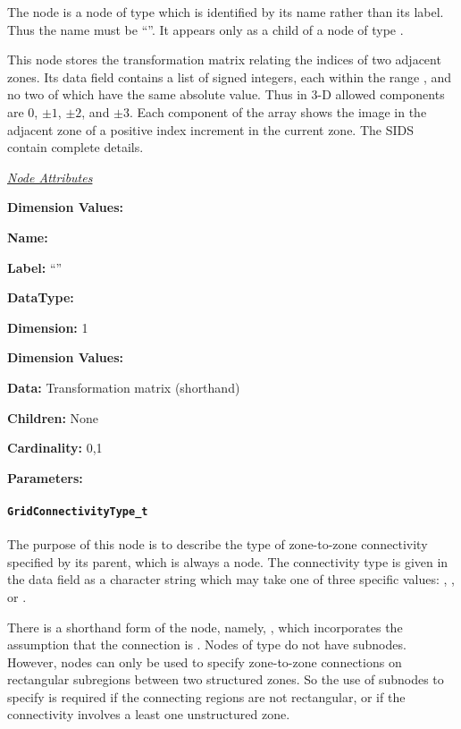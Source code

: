 The  node is a node of type  which is
identified by its name rather than its label. Thus the name must be
``''. It appears only as a child of a node of type
.

This node stores the transformation matrix relating the indices of two
adjacent zones. Its data field contains a list of 
signed integers, each within the range , and no two of which have the same absolute
value. Thus in 3-D allowed components are 0, $\pm 1$, $\pm 2$, and
$\pm 3$. Each component of the array shows the image in the adjacent zone
of a positive index increment in the current zone. The SIDS contain
complete details.

\textit{\uline{Node Attributes}}
\begin{Ventryic}{\textbf{Dimension Values:}}
\item [\textbf{Name:}]
\item [\textbf{Label:}]
      ``''
\item [\textbf{DataType:}]
\item [\textbf{Dimension:}]
      1
\item [\textbf{Dimension Values:}]
\item [\textbf{Data:}]
      Transformation matrix (shorthand)
\item [\textbf{Children:}]
      None
\item [\textbf{Cardinality:}]
      0,1
\item [\textbf{Parameters:}]
\end{Ventryic}

\paragraph{\texttt{GridConnectivityType\_t}}

The purpose of this node is to describe the type of zone-to-zone
connectivity specified by its parent, which is always a
 node. The connectivity type is given in the
data field as a character string which may take one of three specific
values: , , or .

There is a shorthand form of the 
node, namely, , which
incorporates the assumption that the connection is
. Nodes of type 
do not have  subnodes. However,
 nodes can only be used to specify
zone-to-zone connections on rectangular subregions between two
structured zones. So the use of  subnodes
to specify  is required if the connecting regions
are not rectangular, or if the connectivity involves a least one
unstructured zone.

